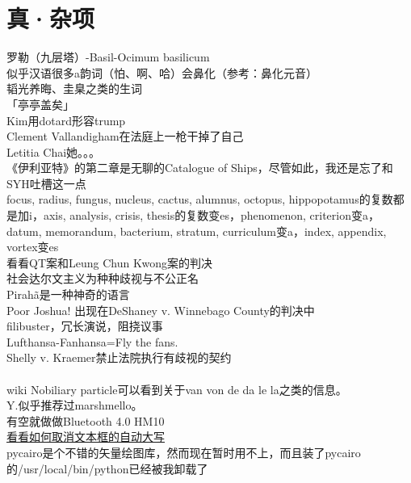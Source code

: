 \documentclass{ctexart}
\begin{document}
\section*{真·杂项}
\noindent 罗勒（九层塔）-Basil-Ocimum basilicum\\
\noindent 似乎汉语很多a韵词（怕、啊、哈）会鼻化（参考：鼻化元音）\\
\noindent 韬光养晦、圭臬之类的生词\\
\noindent 「亭亭盖矣」\\
\noindent Kim用dotard形容trump\\
\noindent Clement Vallandigham在法庭上一枪干掉了自己\\
\noindent Letitia Chai她。。。\\
\noindent 《伊利亚特》的第二章是无聊的Catalogue of Ships，尽管如此，我还是忘了和SYH吐槽这一点\\
\noindent focus, radius, fungus, nucleus, cactus, alumnus, octopus, hippopotamus的复数都是加i，axis, analysis, crisis, thesis的复数变es，phenomenon, criterion变a，datum, memorandum, bacterium, stratum, curriculum变a，index, appendix, vortex变es\\
\noindent 看看QT案和Leung Chun Kwong案的判决\\
\noindent 社会达尔文主义为种种歧视与不公正名\\
\noindent Pirah\~{a}是一种神奇的语言\\
\noindent Poor Joshua! 出现在DeShaney v. Winnebago County的判决中\\
\noindent filibuster，冗长演说，阻挠议事\\
\noindent Lufthansa-Fanhansa=Fly the fans.\\
\noindent Shelly v. Kraemer禁止法院执行有歧视的契约\\
\\
\noindent wiki Nobiliary particle可以看到关于van von de da le la之类的信息。\\
\noindent Y.似乎推荐过marshmello。\\
\noindent 有空就做做Bluetooth 4.0 HM10\\
\noindent \href{https://stackoverflow.com/questions/5171764/how-do-you-turn-off-auto-capitalisation-in-html-form-fields-in-ios}{看看如何取消文本框的自动大写}\\
\noindent pycairo是个不错的矢量绘图库，然而现在暂时用不上，而且装了pycairo的/usr/local/bin/python已经被我卸载了\\
\end{document}
